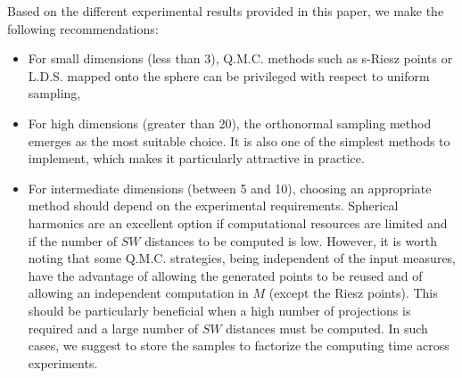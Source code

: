 {Based on the different experimental results provided in this paper, we make the following recommendations:
\begin{itemize}
\item For small dimensions (less than 3), Q.M.C. methods such as s-Riesz points or L.D.S. mapped onto the sphere can be privileged with respect to uniform sampling,
\item For high dimensions (greater than 20), the orthonormal sampling method emerges as the most suitable choice. {It is also one of the simplest methods to implement, which makes it particularly attractive in practice.}
\item For intermediate dimensions (between 5 and 10), choosing an appropriate method should depend on the experimental requirements. 
Spherical harmonics are an excellent option if computational resources are limited and if the number of $SW$ distances to be computed is low. 
However, it is worth noting that some Q.M.C. strategies, being independent of the 
input measures, have the advantage of allowing the generated points to be 
reused and of {allowing an independent computation in $M$ (except the Riesz points)}. This should be particularly beneficial when a high number of projections is required and a large number of $SW$ distances must be computed. In such cases, we suggest to store the samples to factorize the computing time across experiments.
\end{itemize}
}
